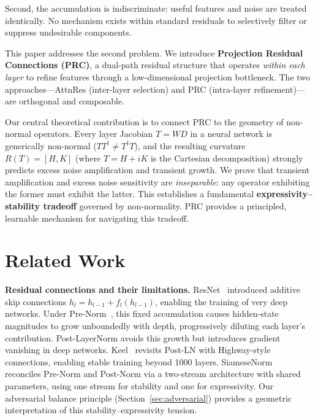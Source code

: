 \documentclass[11pt,a4paper]{article}
\theoremstyle{definition}
\begin{document}
Second, the accumulation is indiscriminate: useful features and noise are treated
identically. No mechanism exists within standard residuals to selectively filter
or suppress undesirable components.

This paper addresses the second problem. We introduce \textbf{Projection Residual
Connections (PRC)}, a dual-path residual structure that operates \emph{within each
layer} to refine features through a low-dimensional projection bottleneck. The two
approaches---AttnRes (inter-layer selection) and PRC (intra-layer refinement)---are
orthogonal and composable.

Our central theoretical contribution is to connect PRC to the geometry of non-normal
operators. Every layer Jacobian $T = WD$ in a neural network is generically
non-normal ($TT^\dagger \neq T^\dagger T$), and the resulting curvature
$R(T) = [H, K]$ (where $T = H + iK$ is the Cartesian decomposition)
strongly predicts excess noise amplification and transient growth.
We prove that transient amplification and excess noise sensitivity are
\emph{inseparable}: any operator exhibiting the former must exhibit the latter.
This establishes a fundamental \textbf{expressivity--stability tradeoff} governed
by non-normality. PRC provides a principled, learnable mechanism for navigating
this tradeoff.

\section{Related Work}
\label{sec:related}

\textbf{Residual connections and their limitations.}
ResNet~\cite{he2016resnet} introduced additive skip connections
$h_l = h_{l-1} + f_l(h_{l-1})$, enabling the training of very deep
networks. Under Pre-Norm~\cite{baevski2019prenorm}, this fixed
accumulation causes hidden-state magnitudes to grow unboundedly
with depth, progressively diluting each layer's contribution.
Post-LayerNorm avoids this growth but introduces gradient vanishing
in deep networks. Keel~\cite{chen2026keel} revisits Post-LN with
Highway-style connections, enabling stable training beyond 1000
layers. SiameseNorm~\cite{li2026siamesenorm} reconciles Pre-Norm
and Post-Norm via a two-stream architecture with shared parameters,
using one stream for stability and one for expressivity. Our
adversarial balance principle (Section~\ref{sec:adversarial})
provides a geometric interpretation of this stability--expressivity
tension.
\end{document}
